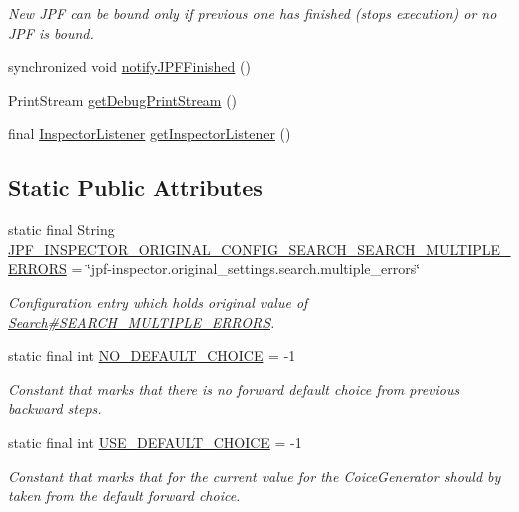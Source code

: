 \begin{DoxyCompactItemize}
\begin{DoxyCompactList}\small\item\em New J\+PF can be bound only if previous one has finished (stops execution) or no J\+PF is bound. \end{DoxyCompactList}\item 
synchronized void \hyperlink{classgov_1_1nasa_1_1jpf_1_1inspector_1_1server_1_1jpf_1_1_j_p_f_inspector_adc9af08362ed367182a0ae89bb96f92f}{notify\+J\+P\+F\+Finished} ()
\item 
Print\+Stream \hyperlink{classgov_1_1nasa_1_1jpf_1_1inspector_1_1server_1_1jpf_1_1_j_p_f_inspector_ab936b10b647a6262639d6474fcba6a16}{get\+Debug\+Print\+Stream} ()
\item 
final \hyperlink{classgov_1_1nasa_1_1jpf_1_1inspector_1_1server_1_1jpf_1_1_inspector_listener}{Inspector\+Listener} \hyperlink{classgov_1_1nasa_1_1jpf_1_1inspector_1_1server_1_1jpf_1_1_j_p_f_inspector_abecd4143627640215d6f2db707718b03}{get\+Inspector\+Listener} ()
\end{DoxyCompactItemize}
\subsection*{Static Public Attributes}
\begin{DoxyCompactItemize}
\item 
static final String \hyperlink{classgov_1_1nasa_1_1jpf_1_1inspector_1_1server_1_1jpf_1_1_j_p_f_inspector_a8af1cac155ad7ceb65c509f627741f3f}{J\+P\+F\+\_\+\+I\+N\+S\+P\+E\+C\+T\+O\+R\+\_\+\+O\+R\+I\+G\+I\+N\+A\+L\+\_\+\+C\+O\+N\+F\+I\+G\+\_\+\+S\+E\+A\+R\+C\+H\+\_\+\+S\+E\+A\+R\+C\+H\+\_\+\+M\+U\+L\+T\+I\+P\+L\+E\+\_\+\+E\+R\+R\+O\+RS} = \char`\"{}jpf-\/inspector.\+original\+\_\+settings.\+search.\+multiple\+\_\+errors\char`\"{}
\begin{DoxyCompactList}\small\item\em Configuration entry which holds original value of \hyperlink{}{Search\#\+S\+E\+A\+R\+C\+H\+\_\+\+M\+U\+L\+T\+I\+P\+L\+E\+\_\+\+E\+R\+R\+O\+RS}. \end{DoxyCompactList}\item 
static final int \hyperlink{interfacegov_1_1nasa_1_1jpf_1_1inspector_1_1interfaces_1_1_choice_generators_interface_a96ec402a57d2b3547337e677e23075cd}{N\+O\+\_\+\+D\+E\+F\+A\+U\+L\+T\+\_\+\+C\+H\+O\+I\+CE} = -\/1
\begin{DoxyCompactList}\small\item\em Constant that marks that there is no forward default choice from previous backward steps. \end{DoxyCompactList}\item 
static final int \hyperlink{interfacegov_1_1nasa_1_1jpf_1_1inspector_1_1interfaces_1_1_choice_generators_interface_ac57a2bb0eb101be2c2b27bd19cb81ea7}{U\+S\+E\+\_\+\+D\+E\+F\+A\+U\+L\+T\+\_\+\+C\+H\+O\+I\+CE} = -\/1
\begin{DoxyCompactList}\small\item\em Constant that marks that for the current value for the Coice\+Generator should by taken from the default forward choice. \end{DoxyCompactList}\end{DoxyCompactItemize}
